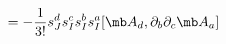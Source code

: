 \begin{equation}
[L_3^{(1)},L_1^{(3)}]=- \frac{1}{3!}s_{J}^{d}s_{I}^{c}  s_{I}^{b}s_{I}^{a}[ {\mb A}_d,\partial_b\partial_c{\mb A}_a]
\end{equation}

